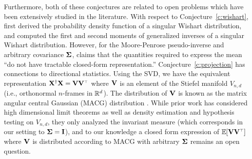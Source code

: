 Furthermore, both of these conjectures are related to open problems
which have been extensively studied in the literature. 
With respect to Conjecture~\ref{c:wishart}, \cite{srivastava2003} first derived the probability
density function of a singular Wishart
distribution, and \cite{cook2011} computed the first and second moments of
generalized inverses of a singular Wishart distribution. However, for the
Moore-Penrose pseudo-inverse and arbitrary covariance $\mathbf{\Sigma}$,
\cite{cook2011} claims that the quantities required
to express the mean ``do not have tractable closed-form representation.''
%
Conjecture~\ref{c:projection} has connections to directional statistics.
Using the SVD, we have the equivalent representation $\X^\dagger \X = \V \V^\top$
where $\mathbf V$ is an element of the Stiefel manifold $V_{n,d}$ (i.e., orthonormal
$n$-frames in $\mathbb R^d$).
The distribution of $\mathbf V$ is known as the matrix angular central
Gaussian (MACG) distribution \cite{chikuse1990matrix}. While prior work
has considered high dimensional limit theorems \cite{CHIKUSE1991145}
as well as density estimation and hypothesis testing \cite{CHIKUSE1998188}
on $V_{n,d}$, they only analyzed the invariant measure
(which corresponds in our setting to $\mathbf{\Sigma} = \mathbf I$),
and to our knowledge a closed form expression of $\E[\V\V^\top]$ where
$\mathbf V$ is distributed according to MACG with
arbitrary $\mathbf{\Sigma}$ remains an open question.

